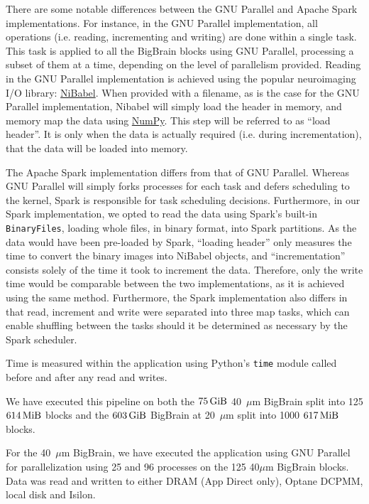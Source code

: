 \documentclass[conference]{IEEEtran}
\newcommand{\bigbrain}{BigBrain\xspace}
\begin{document}
There are some notable differences between the GNU Parallel and Apache Spark implementations.
For instance, in the GNU Parallel implementation, all operations (i.e. reading, incrementing and writing)
are done within a single task. This task is applied to all the \bigbrain blocks using GNU Parallel,
processing a subset of them at a time,
depending on the level of parallelism provided. Reading in the GNU Parallel implementation 
is achieved using the popular neuroimaging I/O library: \href{https://nipy.org/nibabel/}{NiBabel}. When provided with a filename, as is the case
for the GNU Parallel implementation, Nibabel will simply load the header in memory, and memory map the data
using \href{https://numpy.org/}{NumPy}. This step will be referred to as ``load header''. It is only when the data is actually required
(i.e. during incrementation), that the data will be loaded into memory.

The Apache Spark implementation differs from that of GNU Parallel. Whereas GNU Parallel will
simply forks processes for each task and defers scheduling to the kernel, Spark is responsible for 
task scheduling decisions. Furthermore, in our Spark implementation, we opted to read the data using Spark's built-in
\texttt{BinaryFiles}, loading whole files, in binary format, into Spark partitions. As the
data would have been pre-loaded by Spark, ``loading header'' only measures the time to
convert the binary images into NiBabel objects, and ``incrementation'' consists solely
of the time it took to increment the data. Therefore, only the write time would be
comparable between the two implementations, as it is achieved using the same method.
Furthermore, the Spark implementation also differs in that read, increment and write
were separated into three map tasks, which can enable shuffling between the tasks should 
it be determined as necessary by the Spark scheduler.

Time is measured within the application using Python's \texttt{time} module 
called before and after any read and writes.

We have executed this pipeline on both the $\SI{75}{\gibi\byte}$ 40~$\mu$m 
\bigbrain split into 125 $\SI{614}{\mebi\byte}$ blocks and the $\SI{603}{\gibi\byte}$
\bigbrain at 20~$\mu$m split into 1000 $\SI{617}{\mebi\byte}$ blocks.

For the 40~$\mu$m \bigbrain, we have executed the application using GNU Parallel for parallelization
using 25 and 96 processes on the 125 40$\mu$m \bigbrain blocks. Data was read and written to either
DRAM (App Direct only), Optane DCPMM, local disk and Isilon. 
\end{document}
